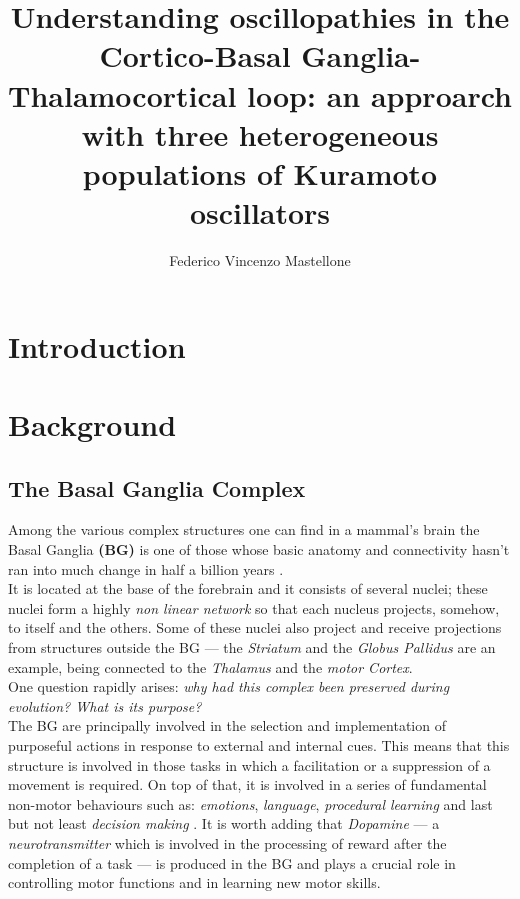 \documentclass[MSc,english]{Container/thesistemplate}
\begin{document}
\author{Federico Vincenzo Mastellone}
\title{Understanding oscillopathies in the Cortico-Basal Ganglia-Thalamocortical loop: an approarch with three heterogeneous populations of Kuramoto oscillators}

\begin{supervisors}
\end{supervisors}

\begin{cosupervisors}
\end{cosupervisors}

\maketitlepage

\tableofcontents

\chapter*{Introduction}


\chapter{Background}
\section{The Basal Ganglia Complex}
Among the various complex structures one can find in a mammal's brain the Basal Ganglia \textbf{(BG)} is one of those whose basic anatomy and connectivity hasn't ran into much change in half a billion years \cite{evol} \cite{nelsonkreitzer}.
\\ It is located at the base of the forebrain and it consists of several nuclei; these nuclei form a highly \emph{non linear network} so that each nucleus projects, somehow, to itself and the others. Some of these nuclei also project and receive projections from structures outside the BG --- the \emph{Striatum} and the \emph{Globus Pallidus} are an example, being connected to the \emph{Thalamus} and the \emph{motor Cortex}.
\\ One question rapidly arises: \emph{why had this complex been preserved during evolution? What is its purpose?}
\\ The BG are principally involved in the selection and implementation of purposeful actions in response to external and internal cues. This means that this structure is involved in those tasks in which a facilitation or a suppression of a movement is required. On top of that, it is involved in a series of fundamental non-motor behaviours such as: \emph{emotions}, \emph{language}, \emph{procedural learning} and last but not least \emph{decision making} \cite{simonyan}. It is worth adding that \emph{Dopamine} --- a \emph{neurotransmitter} which is involved in the processing of reward after the completion of a task --- is produced in the BG and plays a crucial role in controlling motor functions and in learning new motor skills.
\end{document}
